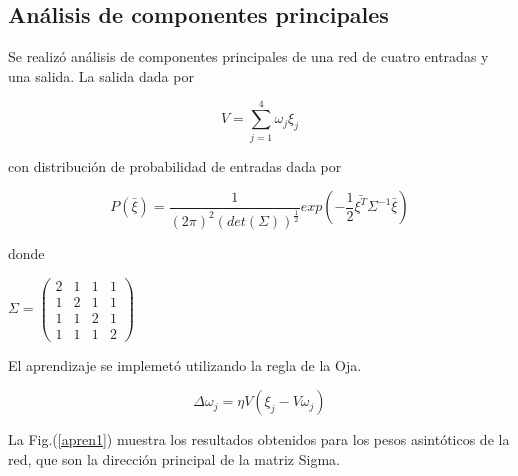 \documentclass[aps,prb,onecolumn,10pt,floatfix,superscriptaddress]{article} %
\begin{document}
\subsection{An\'alisis de componentes principales}

Se realiz\'o an\'alisis de componentes principales de una red de cuatro entradas y una salida. La salida dada por 

\begin{equation}
V = \sum^{4}_{j=1} \omega_{j}\xi_{j}
\end{equation}

con distribuci\'on de probabilidad de entradas dada por 

\begin{equation}
P(\bar{\xi}) = \frac{1}{(2\pi)^{2}(det(\Sigma))^{\frac{1}{2}}} exp(-\frac{1}{2}\bar{\xi^{T}}\Sigma^{-1}\bar{\xi})
\end{equation}

donde 

\begin{math}
\Sigma = 
\left(
  \begin{array}{cccc}
    2 & 1 & 1 & 1 \\
    1 & 2 & 1 & 1 \\
    1 & 1 & 2 & 1 \\
    1 & 1 & 1 & 2
  \end{array}
\right)
\end{math}

El aprendizaje se implemet\'o utilizando la regla de la Oja.

\begin{equation}
\Delta\omega_{j} = \eta V (\xi_{j}-V \omega_{j})
\end{equation}

La Fig.(\ref{apren1}) muestra los resultados obtenidos para los pesos asint\'oticos de la red, que son la direcci\'on principal de la matriz Sigma.
\end{document}
